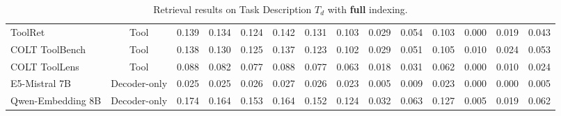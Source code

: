 \documentclass{article} %
\begin{document}
\begin{table}[H]
{\begin{tabular}{lccccccccccccc}
\hline
ToolRet & Tool & 0.139 & 0.134 & 0.124 & 0.142 & 0.131 & 0.103 & 0.029 & 0.054 & 0.103 & 0.000 & 0.019 & 0.043 \\
COLT ToolBench & Tool & 0.138 & 0.130 & 0.125 & 0.137 & 0.123 & 0.102 & 0.029 & 0.051 & 0.105 & 0.010 & 0.024 & 0.053 \\
COLT ToolLens & Tool & 0.088 & 0.082 & 0.077 & 0.088 & 0.077 & 0.063 & 0.018 & 0.031 & 0.062 & 0.000 & 0.010 & 0.024 \\
\hline
E5-Mistral 7B & Decoder-only & 0.025 & 0.025 & 0.026 & 0.027 & 0.026 & 0.023 & 0.005 & 0.009 & 0.023 & 0.000 & 0.000 & 0.005 \\
Qwen-Embedding 8B & Decoder-only & 0.174 & 0.164 & 0.153 & 0.164 & 0.152 & 0.124 & 0.032 & 0.063 & 0.127 & 0.005 & 0.019 & 0.062 \\
\bottomrule
\end{tabular}%
}
\caption{Retrieval results on Task Description $T_d$ with \textbf{full} indexing.}
\label{tab:retrieval_app_desc}
\end{table}
\end{document}
